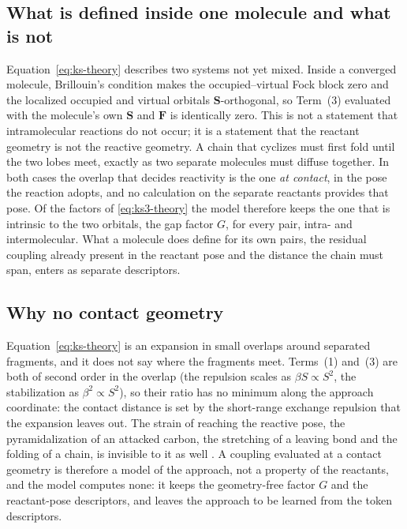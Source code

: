\documentclass[11pt,a4paper]{article}
\newcommand{\vb}[1]{\bm{#1}}
\begin{document}
\subsection{What is defined inside one molecule and what is not}
\label{sec:contact-theory}
Equation~\eqref{eq:ks-theory} describes two systems not yet mixed. Inside a converged molecule, Brillouin's condition makes the occupied--virtual Fock block zero and the localized occupied and virtual orbitals $\vb{S}$-orthogonal, so Term~(3) evaluated with the molecule's own $\vb{S}$ and $\vb{F}$ is identically zero. This is not a statement that intramolecular reactions do not occur; it is a statement that the reactant geometry is not the reactive geometry. A chain that cyclizes must first fold until the two lobes meet, exactly as two separate molecules must diffuse together. In both cases the overlap that decides reactivity is the one \emph{at contact}, in the pose the reaction adopts, and no calculation on the separate reactants provides that pose. Of the factors of \eqref{eq:ks3-theory} the model therefore keeps the one that is intrinsic to the two orbitals, the gap factor $G$, for every pair, intra- and intermolecular. What a molecule does define for its own pairs, the residual coupling already present in the reactant pose and the distance the chain must span, enters as separate descriptors.

\subsection{Why no contact geometry}
\label{sec:beyond}
Equation~\eqref{eq:ks-theory} is an expansion in small overlaps around separated fragments, and it does not say where the fragments meet. Terms~(1) and~(3) are both of second order in the overlap (the repulsion scales as $\beta S\propto S^2$, the stabilization as $\beta^2\propto S^2$), so their ratio has no minimum along the approach coordinate: the contact distance is set by the short-range exchange repulsion that the expansion leaves out. The strain of reaching the reactive pose, the pyramidalization of an attacked carbon, the stretching of a leaving bond and the folding of a chain, is invisible to it as well \cite{bickelhaupt}. A coupling evaluated at a contact geometry is therefore a model of the approach, not a property of the reactants, and the model computes none: it keeps the geometry-free factor $G$ and the reactant-pose descriptors, and leaves the approach to be learned from the token descriptors.
\end{document}
